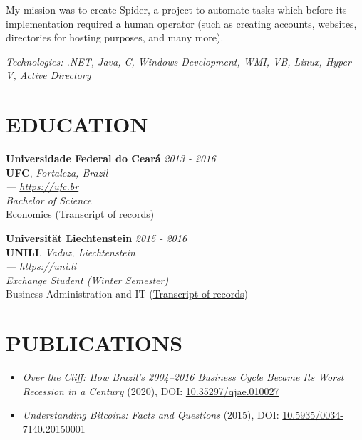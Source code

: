 \documentclass[margin]{res} %
\begin{document}
\begin{resume}
		My mission was to create Spider, a project to automate tasks which before its implementation required a human operator (such as creating accounts, websites, directories for hosting purposes, and many more).

		{\sl Technologies: .NET, Java, C, Windows Development, WMI, VB, Linux, Hyper-V, Active Directory } \\

		\section{EDUCATION}
		{\bf Universidade Federal do Ceará} \hfill {\sl 2013 - 2016}\\
		{\bf UFC}, {\sl Fortaleza, Brazil}  \\
		{\sl — \href{https://ufc.br}{https://ufc.br}} \\
		{\sl Bachelor of Science}  \\
		Economics (\href{https://saboia.it/assets/pdf/transcripts/2016-04-29-transcript-ufc.pdf}{Transcript of records})

		{\bf Universität Liechtenstein} \hfill {\sl 2015 - 2016}\\
		{\bf UNILI}, {\sl Vaduz, Liechtenstein}  \\
		{\sl — \href{https://uni.li}{https://uni.li}} \\
		{\sl Exchange Student (Winter Semester)}  \\
		Business Administration and IT (\href{https://saboia.it/assets/pdf/transcripts/2016-02-17-transcript-liech.pdf}{Transcript of records})
		\\

		\section{PUBLICATIONS}
		\begin{itemize}
			\item {\sl Over the Cliff: How Brazil’s 2004–2016 Business Cycle Became Its Worst Recession in a Century} (2020), DOI: \href{https://doi.org/10.35297/qjae.010027}{10.35297/qjae.010027}
			\item {\sl Understanding Bitcoins: Facts and Questions} (2015), DOI: \href{https://doi.org/10.5935/0034-7140.20150001}{10.5935/0034-7140.20150001}
		\end{itemize}
		\hfill

\end{resume}
\end{document}
